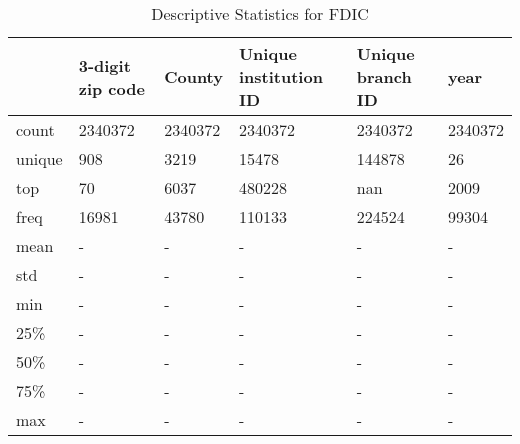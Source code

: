 \begin{table}
\centering
\caption{Descriptive Statistics for FDIC}
\label{tab:des1}
\begin{tabular}{llllll}
\toprule
{} & 3-digit zip code &   County & Unique institution ID & Unique branch ID &     year \\
\midrule
count  &          2340372 &  2340372 &               2340372 &          2340372 &  2340372 \\
unique &              908 &     3219 &                 15478 &           144878 &       26 \\
top    &               70 &     6037 &                480228 &              nan &     2009 \\
freq   &            16981 &    43780 &                110133 &           224524 &    99304 \\
mean   &                - &        - &                     - &                - &        - \\
std    &                - &        - &                     - &                - &        - \\
min    &                - &        - &                     - &                - &        - \\
25\%    &                - &        - &                     - &                - &        - \\
50\%    &                - &        - &                     - &                - &        - \\
75\%    &                - &        - &                     - &                - &        - \\
max    &                - &        - &                     - &                - &        - \\
\bottomrule
\end{tabular}
\end{table}
